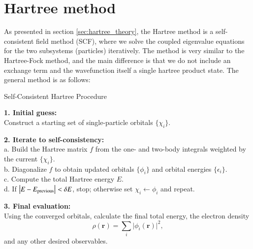 \documentclass{subfiles}
\begin{document}
\section{Hartree method}\label{sec:Hartree_method}
As presented in section \ref{sec:hartree_theory}, the Hartree method is a self-consistent field method (SCF), where we solve the coupled eigenvalue equations for the two subsystems (particles) iteratively. The method is very similar to the Hartree-Fock method, and the main difference is that we do not include an exchange term and the wavefunction itself a single hartree product state. The general method is as follows:
\begin{algorithm}[ht]
\caption{Self-Consistent Hartree Procedure}
\medskip
\noindent\textbf{1. Initial guess:}\\
\quad Construct a starting set of single-particle orbitals \(\{\chi_i\}\).  

\medskip
\noindent\textbf{2. Iterate to self-consistency:}\\
\quad a. Build the Hartree matrix \(f\) from the one- and two-body integrals weighted by the current \(\{\chi_i\}\).\\
\quad b. Diagonalize \(f\) to obtain updated orbitals \(\{\phi_i\}\) and orbital energies \(\{\epsilon_i\}\).\\
\quad c. Compute the total Hartree energy \(E\).\\
\quad d. If \(\bigl|E - E_{\rm previous}\bigr| < \delta E\), stop; otherwise set \(\chi_i \leftarrow \phi_i\) and repeat.

\medskip
\noindent\textbf{3. Final evaluation:}\\
\quad Using the converged orbitals, calculate the final total energy, the electron density
\[
  \rho(\mathbf r)
  = \sum_i \bigl|\phi_i(\mathbf r)\bigr|^2,
\]
and any other desired observables.\label{alg:Hartree}
\end{algorithm}
\end{document}
